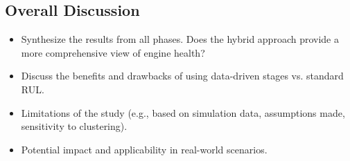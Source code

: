 
\subsection{Overall Discussion}
\begin{itemize}
	\item Synthesize the results from all phases. Does the hybrid approach provide a more comprehensive view of engine health?
	\item Discuss the benefits and drawbacks of using data-driven stages vs. standard RUL.
	\item Limitations of the study (e.g., based on simulation data, assumptions made, sensitivity to clustering).
	\item Potential impact and applicability in real-world scenarios.
\end{itemize}

